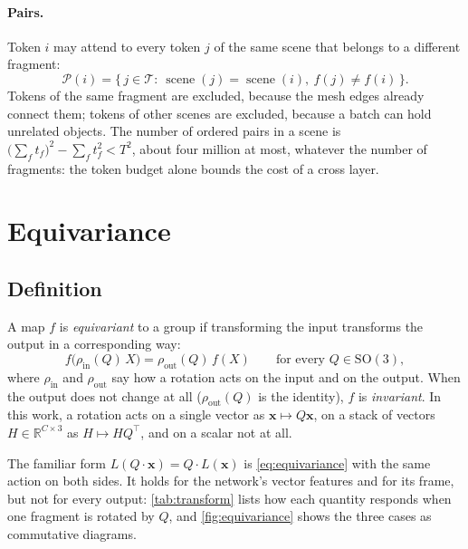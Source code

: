 \documentclass[11pt,a4paper]{article}
\theoremstyle{remark}
\newcommand{\R}{\mathbb{R}}
\newcommand{\SO}{\mathrm{SO}(3)}
\newcommand{\x}{\mathbf{x}}
\newcommand{\T}{^{\top}}
\begin{document}
\paragraph{Pairs.} Token $i$ may attend to every token $j$ of the same scene that belongs to a different fragment:
\begin{equation}
  \mathcal P(i)=\{\,j\in\mathcal T:\ \operatorname{scene}(j)=\operatorname{scene}(i),\ f(j)\ne f(i)\,\}.
\end{equation}
Tokens of the same fragment are excluded, because the mesh edges already connect them; tokens of other scenes are excluded, because a batch can hold unrelated objects. The number of ordered pairs in a scene is $\big(\sum_ft_f\big)^2-\sum_ft_f^2<T^2$, about four million at most, whatever the number of fragments: the token budget alone bounds the cost of a cross layer.

\section{Equivariance}
\label{sec:equivariance}

\subsection{Definition}
A map $f$ is \emph{equivariant} to a group if transforming the input transforms the output in a corresponding way:
\begin{equation}
  f\big(\rho_{\mathrm{in}}(Q)\,X\big)=\rho_{\mathrm{out}}(Q)\,f(X)\qquad\text{for every }Q\in\SO,
  \label{eq:equivariance}
\end{equation}
where $\rho_{\mathrm{in}}$ and $\rho_{\mathrm{out}}$ say how a rotation acts on the input and on the output. When the output does not change at all ($\rho_{\mathrm{out}}(Q)$ is the identity), $f$ is \emph{invariant}. In this work, a rotation acts on a single vector as $\x\mapsto Q\x$, on a stack of vectors $H\in\R^{C\times3}$ as $H\mapsto HQ\T$, and on a scalar not at all.

The familiar form $L(Q\cdot\x)=Q\cdot L(\x)$ is \cref{eq:equivariance} with the same action on both sides. It holds for the network's vector features and for its frame, but not for every output: \cref{tab:transform} lists how each quantity responds when one fragment is rotated by $Q$, and \cref{fig:equivariance} shows the three cases as commutative diagrams.
\end{document}
